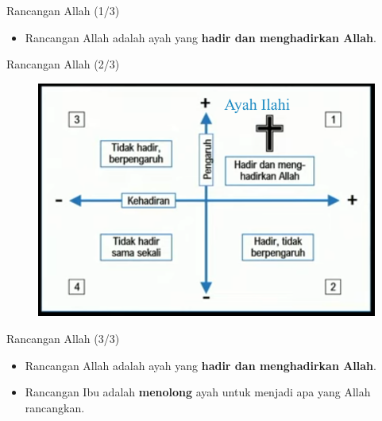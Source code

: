 \documentclass{beamer}
\theoremstyle{mystyle}
\begin{document}
\begin{frame}{Rancangan Allah (1/3)}
	\begin{itemize}
		\item Rancangan Allah adalah ayah yang \textbf{hadir dan menghadirkan Allah}.
	\end{itemize}
\end{frame}

\begin{frame}{Rancangan Allah (2/3)}
	\begin{figure}[!ht]
	\centering
	\includegraphics[scale=.3]{images/tabel-ayah-ilahi}
\end{figure}
\end{frame}

\begin{frame}{Rancangan Allah (3/3)}
	\begin{itemize}
		\item Rancangan Allah adalah ayah yang \textbf{hadir dan menghadirkan Allah}.
		\item Rancangan Ibu adalah \textbf{menolong} ayah untuk menjadi apa yang Allah rancangkan.
	\end{itemize}
\end{frame}
\end{document}
